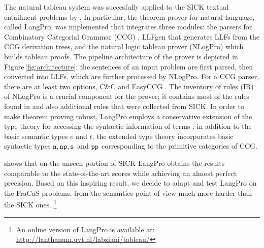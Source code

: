 \documentclass[11pt]{article}
\newcommand{\candc}{C\&C}
\newcommand{\easyccg}{EasyCCG}
\newcommand{\sick}{SICK}
\newcommand{\langpro}{LangPro}
\newcommand{\llfgen}{LLFgen}
\newcommand{\nlogpro}{NLogPro}
\newcommand{\pp}{{\tt pp}}
\newcommand{\np}{{\tt np}}
\newcommand{\sen}{{\tt s}}
\newcommand{\nou}{{\tt n}}
\begin{document}


The natural tableau system was succesfully applied to the \sick{} textual entailment problems \cite{sick:14} by .
In particular, the theorem prover for natural language, called \langpro{}, was implemented that integrates three modules: the parsers for Combinatory Categorial Grammar (CCG) \cite{Steedman:2000}, \llfgen{} that generates LLFs from the CCG derivation trees, and the natural logic tableau prover (\nlogpro{}) which builds tableau proofs.
The pipeline architecture of the prover is depicted in Figure\,\ref{fig:architecture}: the sentences of an input problem are first parsed, then converted into LLFs, which are further processed by \nlogpro{}. 
For a CCG parser, there are at least two options, \candc{} \cite{cc:2007,HonnibalCurranBos2010} and \easyccg{} \cite{lewis-steedman:14}.
The inventory of rules (IR) of \nlogpro{} is a crucial component for the prover; 
it contains most of the rules found in \cite{muskens:10} and also additional rules that were collected from \sick{}.
In order to make theorem proving robust, LangPro employs a conservative extension of the type theory for accessing the syntactic information of terms \cite{abzianidze:2015:LENLS}: in addition to the basic semantic types $e$ and $t$, the extended type theory incorporates basic syntactic types $\nou, \np, \sen$ and $\pp$ corresponding to the primitive categories of CCG.    

 shows that on the unseen portion of \sick{} LangPro obtains the results comparable to the state-of-the-art scores while achieving an almost perfect precision. 
Based on this inspiring result, we decide to adapt and test LangPro on the FraCaS problems, from the semantics point of view much more harder than the \sick{} ones.%
%
\footnote{An online version of LangPro is available at: \url{http://lanthanum.uvt.nl/labziani/tableau/}
} 
\end{document}

